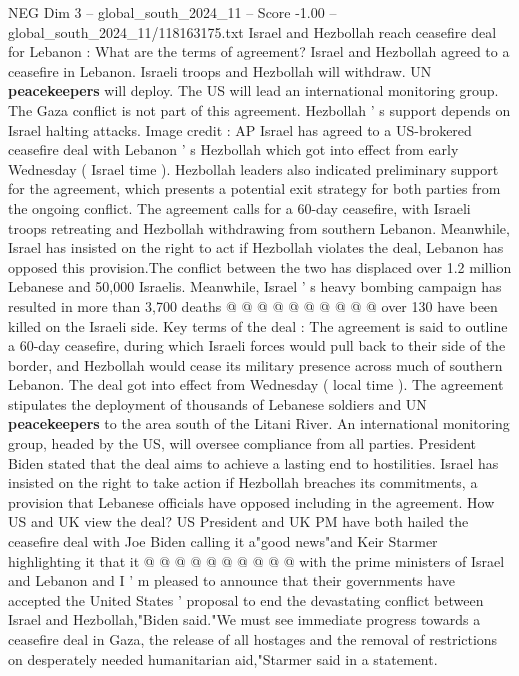 \begin{textsample}{NEG Dim 3 – global\_south\_2024\_11 – Score -1.00 – global\_south\_2024\_11/118163175.txt}  \label{ex:f3_neg_154}
Israel and Hezbollah reach ceasefire deal for Lebanon : What are the terms of agreement?
Israel and Hezbollah agreed to a ceasefire in Lebanon.
Israeli troops and Hezbollah will withdraw.
UN \textbf{peacekeepers} will deploy.
The US will lead an international monitoring group.
The Gaza conflict is not part of this agreement.
Hezbollah ' s support depends on Israel halting attacks.
Image credit : AP Israel has agreed to a US-brokered ceasefire deal with Lebanon ' s Hezbollah which got into effect from early Wednesday ( Israel time ).
Hezbollah leaders also indicated preliminary support for the agreement, which presents a potential exit strategy for both parties from the ongoing conflict.
The agreement calls for a 60-day ceasefire, with Israeli troops retreating and Hezbollah withdrawing from southern Lebanon.
Meanwhile, Israel has insisted on the right to act if Hezbollah violates the deal, Lebanon has opposed this provision.The conflict between the two has displaced over 1.2 million Lebanese and 50,000 Israelis.
Meanwhile, Israel ' s heavy bombing campaign has resulted in more than 3,700 deaths @ @ @ @ @ @ @ @ @ @ over 130 have been killed on the Israeli side.
Key terms of the deal : The agreement is said to outline a 60-day ceasefire, during which Israeli forces would pull back to their side of the border, and Hezbollah would cease its military presence across much of southern Lebanon.
The deal got into effect from Wednesday ( local time ).
The agreement stipulates the deployment of thousands of Lebanese soldiers and UN \textbf{peacekeepers} to the area south of the Litani River.
An international monitoring group, headed by the US, will oversee compliance from all parties.
President Biden stated that the deal aims to achieve a lasting end to hostilities.
Israel has insisted on the right to take action if Hezbollah breaches its commitments, a provision that Lebanese officials have opposed including in the agreement.
How US and UK view the deal?
US President and UK PM have both hailed the ceasefire deal with Joe Biden calling it a"good news"and Keir Starmer highlighting it that it @ @ @ @ @ @ @ @ @ @ with the prime ministers of Israel and Lebanon and I ' m pleased to announce that their governments have accepted the United States ' proposal to end the devastating conflict between Israel and Hezbollah,"Biden said."We must see immediate progress towards a ceasefire deal in Gaza, the release of all hostages and the removal of restrictions on desperately needed humanitarian aid,"Starmer said in a statement.

\end{textsample}
